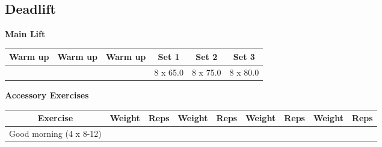 \documentclass{article}%
\begin{document}
%
\subsection*{Deadlift}%
\vspace*{20pt}%
\linebreak%
\begin{minipage}{0.5\textwidth}%
\textbf{Main Lift\newline%
\newline%
}%
\begin{tabular}{|c|c|c|c|c|c|}%
\hline%
Warm up&Warm up&Warm up&Set 1&Set 2&Set 3\\%
\hline%
&&&8 x 65.0&8 x 75.0&8 x 80.0\\%
\hline%
\end{tabular}%
\vspace*{20pt}%
\linebreak%
\textbf{Accessory Exercises\newline%
\newline%
}%
\begin{tabular}{|c|c|c|c|c|c|c|c|c|}%
\hline%
Exercise&Weight&Reps&Weight&Reps&Weight&Reps&Weight&Reps\\%
\hline%
Good morning (4 x 8{-}12)&&&&&&&&\\%
\hline%
\end{tabular}%
\end{minipage}%
\vspace*{20pt}%
\linebreak

%
\end{document}
